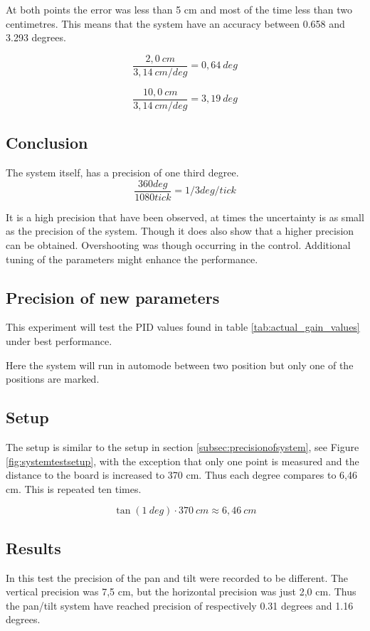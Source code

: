 At both points the error was less than 5 cm and most of the time
less than two centimetres. This means that the system have an accuracy between 0.658 and
3.293 degrees.

\[ \frac{2,0 \ cm}{3,14\ cm/deg} = 0,64 \ deg \]

\[ \frac{10,0 \ cm}{3,14 \ cm/deg} = 3,19 \ deg \]

\subsection*{Conclusion}

The system itself, has a precision of one third degree.
\[ \frac{360 deg}{1080 tick} = 1/3 deg/tick \]

It is a high precision that have been observed, at times the uncertainty is as
small as the precision of the system. Though it does also show that a higher
precision can be obtained. Overshooting was though occurring in the control.
Additional tuning of the parameters might enhance the performance.

\subsection{Precision of new parameters}\label{sec:precisionofsystem2}

This experiment will test the PID values found in table \ref{tab:actual_gain_values}
under best performance.

Here the system will run in automode between two position but only one of the
positions are marked. 

\subsection*{Setup}

The setup is similar to the setup in section \ref{subsec:precisionofsystem}, see
Figure \ref{fig:systemtestsetup}, with the exception that only one point is measured and the distance to the board is increased to 370 cm. Thus each degree compares to 6,46 cm. This is repeated ten times.

\[ \tan(1 \ deg) \cdot 370 \ cm \approx 6,46 \ cm \]

\subsection*{Results}

In this test the precision of the pan and tilt were recorded to be different. The vertical precision was 7,5 cm, but the horizontal precision was just 2,0 cm. Thus the pan/tilt system have
reached precision of respectively 0.31 degrees and 1.16 degrees.


